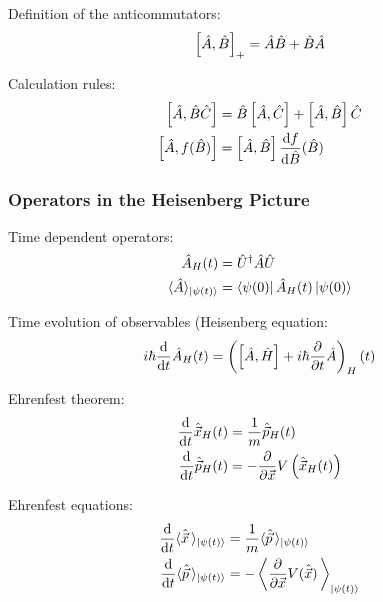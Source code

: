 			\noindent
			Definition of the anticommutators:
			\begin{equation}
				\left[\hat{A},\hat{B}\right]_{+} = \hat{A}\hat{B} + \hat{B}\hat{A}
			\end{equation}

			\noindent
			Calculation rules:
			\begin{equation}
				\begin{aligned}
					\left[\hat{A},\hat{B}\hat{C}\right]
					&= \hat{B}\left[\hat{A},\hat{C}\right] + \left[\hat{A},\hat{B}\right]\hat{C} \\
					\left[\hat{A},f(\hat{B})\right]
					&= \left[\hat{A},\hat{B}\right]\frac{\mathrm{d} f}{\mathrm{d} \hat{B}}(\hat{B})
				\end{aligned}
			\end{equation}

		\subsubsection{Operators in the Heisenberg Picture}
			\noindent
			Time dependent operators:
			\begin{equation}
				\begin{aligned}
					\hat{A}_H(t) &= \hat{U}^\dagger \hat{A} \hat{U} \\
					\langle \hat{A} \rangle_{\Ket{\psi(t)}} &= \Bra{\psi(0)}\hat{A}_H(t)\Ket{\psi(0)}
				\end{aligned}
			\end{equation}

			\noindent
			Time evolution of observables (Heisenberg equation:
			\begin{equation}
				i\hbar \frac{\mathrm{d} }{\mathrm{d} t} \hat{A}_H(t) = \left(\left[\hat{A}, \hat{H}\right] + i\hbar \frac{\partial }{\partial t} \hat{A}\right)_H (t)
			\end{equation}

			\noindent
			Ehrenfest theorem:
			\begin{equation}
				\begin{aligned}
					\frac{\mathrm{d} }{\mathrm{d} t} \hat{\vec{x}}_H(t) &= \frac{1}{m}\hat{\vec{p}}_H(t) \\
					\frac{\mathrm{d} }{\mathrm{d} t} \hat{\vec{p}}_H(t) &= - \frac{\partial }{\partial \vec{x}} V \left(\hat{\vec{x}}_H(t)\right) \\
				\end{aligned}
			\end{equation}

			\noindent
			Ehrenfest equations:
			\begin{equation}
				\begin{aligned}
					\frac{\mathrm{d} }{\mathrm{d} t} \langle \hat{\vec{x}} \,\rangle_{\Ket{\psi(t)}} &= \frac{1}{m} \langle \hat{\vec{p}} \,\rangle_{\Ket{\psi(t)}} \\
					\frac{\mathrm{d} }{\mathrm{d} t} \langle \hat{\vec{p}} \,\rangle_{\Ket{\psi(t)}} &= - \left\langle \frac{\partial }{\partial \vec{x}} V(\hat{\vec{x}}) \,\right\rangle_{\Ket{\psi(t)}} \\
				\end{aligned}
			\end{equation}

